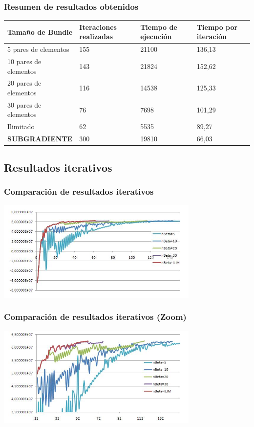 \documentclass[xcolor=dvipsnames, utf8, spanish]{beamer} %
\begin{document}
\begin{frame}
	\frametitle{Resumen de resultados obtenidos}
	\begin{center}
		\begin{tabular}{p{3.5cm}p{2cm}p{2cm}p{2.2cm}}
			\toprule
			\textbf{Tamaño de Bundle} & \textbf{Iteraciones realizadas} & \textbf{Tiempo de ejecución} & \textbf{Tiempo por iteración} \\
			\midrule
			5 pares de elementos & 155 & 21100 & 136,13 \\
			10 pares de elementos & 143 & 21824 & 152,62 \\
			20 pares de elementos & 116 & 14538 & 125,33 \\
			30 pares de elementos & 76 & 7698 & 101,29 \\
			Ilimitado & 62 & 5535 & 89,27 \\
			\midrule
			\textbf{SUBGRADIENTE} & 300 & 19810 & 66,03 \\
			\bottomrule
		\end{tabular}
	\end{center}
\end{frame}


\subsection{Resultados iterativos}

\begin{frame}
	\frametitle{Comparación de resultados iterativos}
	\begin{center}
		\includegraphics[width=10cm]{figuras/procesoIterativo.JPG}
	\end{center}
\end{frame}

\begin{frame}
	\frametitle{Comparación de resultados iterativos (Zoom)}
	\begin{center}
		\includegraphics[width=10cm]{figuras/procesoIterativoZoom.JPG}
	\end{center}
\end{frame}
\end{document}
